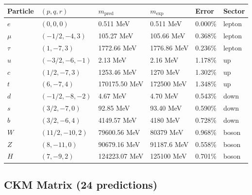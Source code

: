 \begin{center}
\label{tab:mass_cat}
\begin{tabular}{llllll}
\hline\hline
Particle & $(p,q,r)$ & $m_{\mathrm{pred}}$ & $m_{\mathrm{exp}}$ & Error & Sector \\
\hline
$e$ & $(0,0,0)$ & 0.511 MeV & 0.511 MeV & 0.000\% & lepton \\
$\mu$ & $(-1/2,-4,3)$ & 105.27 MeV & 105.66 MeV & 0.368\% & lepton \\
$\tau$ & $(1,-7,3)$ & 1772.66 MeV & 1776.86 MeV & 0.236\% & lepton \\
$u$ & $(-3/2,-6,-1)$ & 2.13 MeV & 2.16 MeV & 1.178\% & up \\
$c$ & $(1/2,-7,3)$ & 1253.46 MeV & 1270 MeV & 1.302\% & up \\
$t$ & $(6,-7,4)$ & 170175.50 MeV & 172500 MeV & 1.348\% & up \\
$d$ & $(-1/2,-8,-2)$ & 4.67 MeV & 4.70 MeV & 0.543\% & down \\
$s$ & $(3/2,-7,0)$ & 92.85 MeV & 93.40 MeV & 0.590\% & down \\
$b$ & $(3/2,-6,4)$ & 4149.57 MeV & 4180 MeV & 0.728\% & down \\
$W$ & $(11/2,-10,2)$ & 79600.56 MeV & 80379 MeV & 0.968\% & boson \\
$Z$ & $(8,-11,0)$ & 90679.16 MeV & 91187.6 MeV & 0.558\% & boson \\
$H$ & $(7,-9,2)$ & 124223.07 MeV & 125100 MeV & 0.701\% & boson \\
\hline\hline
\end{tabular}
\end{center}

\subsection{CKM Matrix (24 predictions)}\label{app:ckm_cat}

